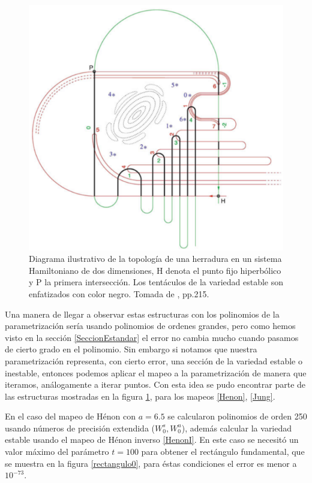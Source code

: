 \begin{figure}[H]
\centering
\includegraphics[scale=0.25]{herradura}
\caption{Diagrama ilustrativo de la topología de una herradura en un sistema Hamiltoniano de dos dimensiones, H denota el punto fijo hiperbólico y P la primera intersección. Los tentáculos de la variedad estable son enfatizados con color negro. Tomada de \cite{Ying}, pp.215.}
\label{herradura}
\end{figure}

Una manera de llegar a observar estas estructuras con los polinomios de la parametrización sería usando polinomios de ordenes grandes, pero como hemos visto en la sección \ref{SeccionEstandar} el error no cambia mucho cuando pasamos de cierto grado en el polinomio. Sin embargo si notamos que nuestra parametrización representa, con cierto error, una sección de la variedad estable o inestable, entonces podemos aplicar el mapeo a la parametrización de manera que iteramos, análogamente a iterar puntos. Con esta idea se pudo encontrar parte de las estructuras mostradas en la figura \ref{herradura}, para los mapeos \ref{Henon}, \ref{Jung}.


En el caso del mapeo de Hénon con $a=6.5$ se calcularon polinomios de orden 250 usando números de precisión extendida ($W_{0}^{s},W_{0}^{u}$), además calcular la variedad estable usando el mapeo de Hénon inverso \ref{HenonI}. En este caso se necesitó un valor máximo del parámetro $t=100$ para obtener el rectángulo fundamental, que se muestra en la figura \ref{rectangulo0}, para éstas condiciones el error es menor a $10^{-73}$.

